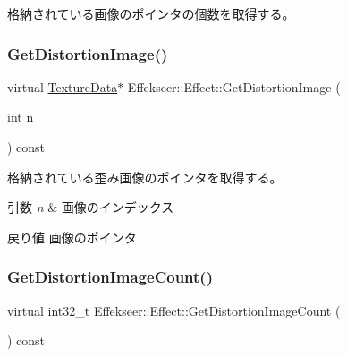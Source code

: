 格納されている画像のポインタの個数を取得する。 

\mbox{\label{class_effekseer_1_1_effect_a846840e790b1b4dff1b5cb8f8bce44dc}} 
\subsubsection{\texorpdfstring{Get\+Distortion\+Image()}{GetDistortionImage()}}
{\footnotesize\ttfamily virtual \mbox{\hyperlink{struct_effekseer_1_1_texture_data}{Texture\+Data}}$\ast$ Effekseer\+::\+Effect\+::\+Get\+Distortion\+Image (\begin{DoxyParamCaption}\item[{\mbox{\hyperlink{namespace_effekseer_ace0abf7c2e6947e519ebe8b54cbcc30a}{int}}}]{n }\end{DoxyParamCaption}) const\hspace{0.3cm}{\ttfamily [pure virtual]}}



格納されている歪み画像のポインタを取得する。 


\begin{DoxyParams}{引数}
{\em n} & 画像のインデックス \\
\hline
\end{DoxyParams}
\begin{DoxyReturn}{戻り値}
画像のポインタ 
\end{DoxyReturn}
\mbox{\label{class_effekseer_1_1_effect_a25718ad6a563549f2b6c12fb70827b38}} 
\subsubsection{\texorpdfstring{Get\+Distortion\+Image\+Count()}{GetDistortionImageCount()}}
{\footnotesize\ttfamily virtual int32\+\_\+t Effekseer\+::\+Effect\+::\+Get\+Distortion\+Image\+Count (\begin{DoxyParamCaption}{ }\end{DoxyParamCaption}) const\hspace{0.3cm}{\ttfamily [pure virtual]}}




